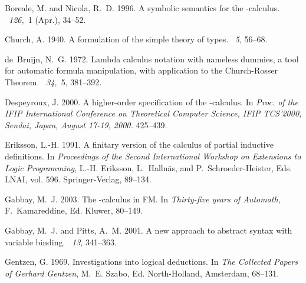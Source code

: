 \documentclass{acmtrans2m}
\begin{document}
\begin{thebibliography}{}
{\sc Boreale, M.} {\sc and} {\sc Nicola, R.~D.} 1996.
\newblock A symbolic semantics for the -calculus.
~{\em 126,\/}~1 (Apr.), 34--52.

{\sc Church, A.} 1940.
\newblock A formulation of the simple theory of types.
~{\em 5}, 56--68.

{\sc de~Bruijn, N.~G.} 1972.
\newblock Lambda calculus notation with nameless dummies, a tool for automatic
  formula manipulation, with application to the {Church-Rosser Theorem}.
~{\em 34,\/}~5, 381--392.

{\sc Despeyroux, J.} 2000.
\newblock A higher-order specification of the -calculus.
\newblock In {\em Proc. of the IFIP International Conference on Theoretical
  Computer Science, IFIP TCS'2000, Sendai, Japan, August 17-19, 2000.}
  425--439.

{\sc Eriksson, L.-H.} 1991.
\newblock A finitary version of the calculus of partial inductive definitions.
\newblock In {\em Proceedings of the Second International Workshop on
  Extensions to Logic Programming}, {L.-H. Eriksson}, {L.~Halln{\"{a}}s}, {and}
  {P.~Schroeder-Heister}, Eds. LNAI, vol. 596. Springer-Verlag, 89--134.

{\sc Gabbay, M.~J.} 2003.
\newblock The -calculus in {FM}.
\newblock In {\em Thirty-five years of {A}utomath}, {F.~Kamareddine}, Ed.
  Kluwer, 80--149.

{\sc Gabbay, M.~J.} {\sc and} {\sc Pitts, A.~M.} 2001.
\newblock A new approach to abstract syntax with variable binding.
~{\em 13}, 341--363.

{\sc Gentzen, G.} 1969.
\newblock Investigations into logical deductions.
\newblock In {\em {The Collected Papers of Gerhard Gentzen}}, {M.~E. Szabo},
  Ed. North-Holland, Amsterdam, 68--131.


\end{thebibliography}
\end{document}
